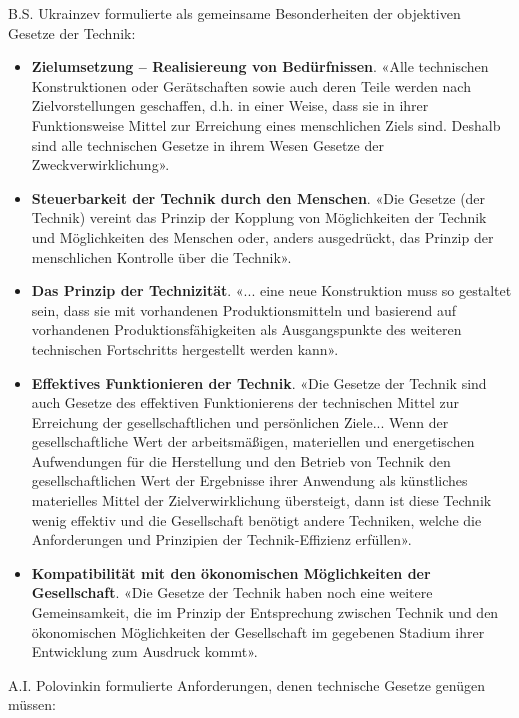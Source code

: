 \documentclass[11pt,a4paper]{article}
\begin{document}
B.S. Ukrainzev formulierte als gemeinsame Besonderheiten der objektiven
Gesetze der Technik:
\begin{itemize}
\item \textbf{Zielumsetzung -- Realisiereung von Bedürfnissen}. «Alle
  technischen Konstruktionen oder Gerätschaften sowie auch deren Teile werden
  nach Zielvorstellungen geschaffen, d.h. in einer Weise, dass sie in ihrer
  Funktionsweise Mittel zur Erreichung eines menschlichen Ziels sind.  Deshalb
  sind alle technischen Gesetze in ihrem Wesen Gesetze der
  Zweckverwirklichung».
\item \textbf{Steuerbarkeit der Technik durch den Menschen}. «Die Gesetze (der
  Technik) vereint das Prinzip der Kopplung von Möglichkeiten der Technik und
  Möglichkeiten des Menschen oder, anders ausgedrückt, das Prinzip der
  menschlichen Kontrolle über die Technik».
\item \textbf{Das Prinzip der Technizität}. «... eine neue Konstruktion muss
  so gestaltet sein, dass sie mit vorhandenen Produktionsmitteln und basierend
  auf vorhandenen Produktionsfähigkeiten als Ausgangspunkte des weiteren
  technischen Fortschritts hergestellt werden kann».
\item \textbf{Effektives Funktionieren der Technik}. «Die Gesetze der Technik
  sind auch Gesetze des effektiven Funktionierens der technischen Mittel zur
  Erreichung der gesellschaftlichen und persönlichen Ziele... Wenn der
  gesellschaftliche Wert der arbeitsmäßigen, materiellen und energetischen
  Aufwendungen für die Herstellung und den Betrieb von Technik den
  gesellschaftlichen Wert der Ergebnisse ihrer Anwendung als künstliches
  materielles Mittel der Zielverwirklichung übersteigt, dann ist diese Technik
  wenig effektiv und die Gesellschaft benötigt andere Techniken, welche die
  Anforderungen und Prinzipien der Technik-Effizienz erfüllen».
\item \textbf{Kompatibilität mit den ökonomischen Möglichkeiten der
  Gesellschaft}.  «Die Gesetze der Technik haben noch eine weitere
  Gemeinsamkeit, die im Prinzip der Entsprechung zwischen Technik und den
  ökonomischen Möglichkeiten der Gesellschaft im gegebenen Stadium ihrer
  Entwicklung zum Ausdruck kommt».
\end{itemize}
A.I. Polovinkin formulierte Anforderungen, denen technische Gesetze genügen
müssen:
\end{document}
